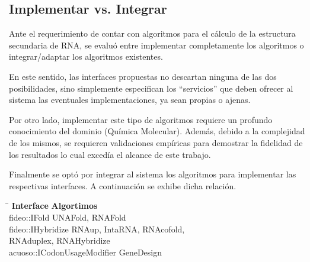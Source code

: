 \subsection{Implementar vs. Integrar}

\par Ante el requerimiento de contar con algoritmos para el cálculo de la estructura secundaria de RNA, se evaluó entre implementar completamente los algoritmos o integrar/adaptar los algoritmos existentes.

\par En este sentido, las interfaces propuestas no descartan ninguna de las dos posibilidades, sino simplemente especifican los ``servicios'' que deben ofrecer al sistema las eventuales implementaciones, ya sean propias o ajenas.

\par Por otro lado, implementar este tipo de algoritmos requiere un profundo conocimiento del dominio (Química Molecular). Además, debido a la complejidad de los mismos, se requieren validaciones empíricas para demostrar la fidelidad de los resultados lo cual excedía el alcance de este trabajo.

\par Finalmente se optó por integrar al sistema los algoritmos para implementar las respectivas interfaces. A continuación se exhibe dicha relación.

\begin{tabbing}
\hspace*{6.5cm} \= \hspace*{5cm} \kill
\hspace*{1cm} \textbf{Interface} \> \textbf{Algortimos} \\
\hspace*{.9cm} fideo::IFold \> UNAFold, RNAFold \\      
\hspace*{1cm}fideo::IHybridize \> RNAup, IntaRNA, RNAcofold, \\
\hspace*{6.6cm}RNAduplex, RNAHybridize \\
\hspace*{1cm}acuoso::ICodonUsageModifier \> GeneDesign \\
\end{tabbing}

